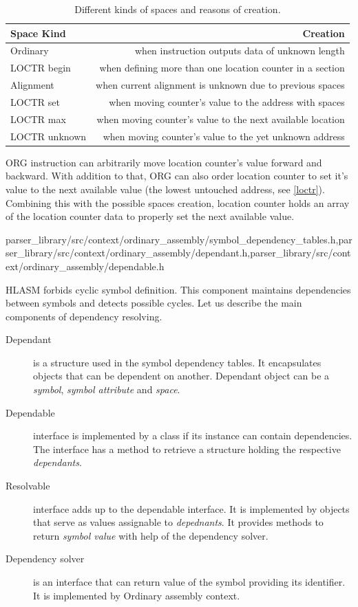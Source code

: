\begin{table}
	\centering
	\begin{tabular}{lr}
		\textbf{Space Kind} &                                          \textbf{Creation} \\ \toprule
		Ordinary            &            when instruction outputs data of unknown length \\
		LOCTR begin         &  when defining more than one location counter in a section \\
		Alignment           &   when current alignment is unknown due to previous spaces \\
		LOCTR set           &     when moving counter's value to the address with spaces \\
		LOCTR max           & when moving counter's value to the next available location \\
		LOCTR unknown       &     when moving counter's value to the yet unknown address \\ \bottomrule
	\end{tabular}
	\caption{Different kinds of spaces and reasons of creation.}
	\label{tab06:space}
\end{table}

ORG instruction can arbitrarily move location counter's value forward and backward. With addition to that, ORG can also order location counter to set it's value to the next available value (the lowest untouched address, see \cref{loctr}). Combining this with the possible spaces creation, location counter holds an array of the location counter data to properly set the next available value.

{parser\_library/src/context/ordinary\_assembly/symbol\_dependency\_tables.h,parser\_library/src/context/ordinary\_assembly/dependant.h,parser\_library/src/context/ordinary\_assembly/dependable.h}
\label{symbol_dependency_tables}

HLASM forbids cyclic symbol definition. This component maintains dependencies between symbols and detects possible cycles.
Let us describe the main components of dependency resolving.

\begin{description}
	\item[Dependant] is a structure used in the symbol dependency tables. It encapsulates objects that can be dependent on another. Dependant object can be a \emph{symbol}, \emph{symbol attribute} and \emph{space}.
	\item[Dependable] interface is implemented by a class if its instance can contain dependencies. The interface has a method to retrieve a structure holding the respective \emph{dependants}. 
	\item[Resolvable] interface adds up to the dependable interface. It is implemented by objects that serve as values assignable to \emph{depednants}. It provides methods to return \emph{symbol value} with help of the dependency solver. 
	\item[Dependency solver] is an interface that can return value of the symbol providing its identifier. It is implemented by Ordinary assembly context.
\end{description}

